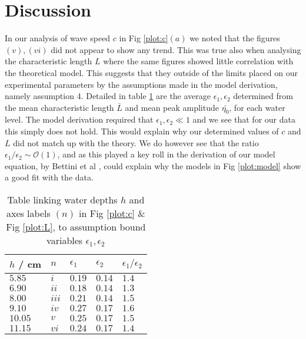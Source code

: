 \documentclass[10pt, twocolumn]{revtex4}    %
\begin{document}
\section{Discussion}
In our analysis of wave speed $c$ in Fig \ref{plot:c}$(a)$ we noted that the figures $(v), (vi)$ did not appear to show any trend.
This was true also when analysing the characteristic length $L$ where the same figures showed little correlation with the theoretical model.
This suggests that they outside of the limits placed on our experimental parameters by the assumptions made in the model derivation, namely assumption 4.
Detailed in table \ref{table:limits} are the average $\epsilon_1, \epsilon_2$ determined from the mean characteristic length $\bar{L}$ and mean peak amplitude $\bar{\eta_0}$, for each water level.
The model derivation required that $\epsilon_1, \epsilon_2 \ll 1$ and we see that for our data this simply does not hold.
This would explain why our determined values of $c$ and $L$ did not match up with the theory.
We do however see that the ratio $\epsilon_1 / \epsilon_2\sim\mathcal{O}(1)$, and as this played a key roll in the derivation of our model equation, by Bettini et al \cite{bettini}, could explain why the models in Fig \ref{plot:model} show a good fit with the data.

\begin{table}[!h]
\centering
\begin{tabularx}{\columnwidth}{ X  X  X  X  X }
  \hline
  $h$ / cm & $n$     & $\epsilon_1$ & $\epsilon_2$ & $\epsilon_1 / \epsilon_2$\\
  \hline\hline
  $5.85$   & $ i $   & $0.19$       & $0.14$       & $1.4$                     \\
  $6.90$   & $ ii $  & $0.18$       & $0.14$       & $1.3$                     \\
  $8.00$   & $ iii $ & $0.21$       & $0.14$       & $1.5$                     \\
  $9.10$   & $ iv $  & $0.27$       & $0.17$       & $1.6$                     \\
  $10.05$  & $ v $   & $0.25$       & $0.17$       & $1.5$                     \\
  $11.15$  & $ vi $  & $0.24$       & $0.17$       & $1.4$                      \\
  \hline
\end{tabularx}
\caption{
Table linking water depths $h$ and axes labels $(n)$ in Fig \ref{plot:c} \& Fig \ref{plot:L}, to assumption bound variables $\epsilon_1 , \epsilon_2$
}
\label{table:limits}
\end{table}
\end{document}

